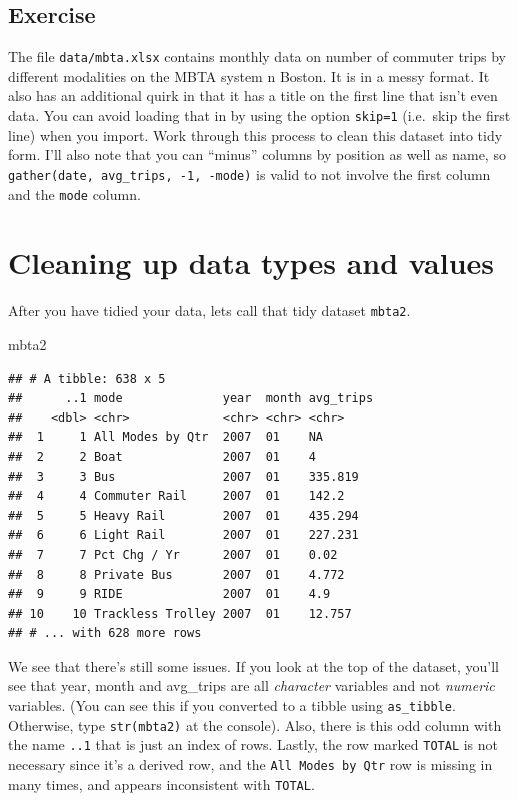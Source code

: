 \documentclass[12pt,letterpaperpaper,openany]{book}
\newenvironment{Shaded}{\begin{snugshade}}{\end{snugshade}}
\newcommand{\NormalTok}[1]{#1}
\begin{document}
\hypertarget{exercise}{%
\subsection*{Exercise}\label{exercise}}

The file \texttt{data/mbta.xlsx} contains monthly data on number of commuter trips by different modalities on the MBTA system n Boston. It
is in a messy format. It also has an additional quirk in that it has a title on the first line that
isn't even data. You can avoid loading that in by using the option \texttt{skip=1} (i.e.~skip the first line) when you
import. Work through this process to clean this dataset into tidy form. I'll also note that you can ``minus'' columns by
position as well as name, so \texttt{gather(date,\ avg\_trips,\ -1,\ -mode)} is valid to not involve the first column and the \texttt{mode} column.

\hypertarget{cleaning-up-data-types-and-values}{%
\section{Cleaning up data types and values}\label{cleaning-up-data-types-and-values}}

After you have tidied your data, lets call that tidy dataset \texttt{mbta2}.

\begin{Shaded}
\begin{Highlighting}[]
\NormalTok{mbta2}
\end{Highlighting}
\end{Shaded}

\begin{verbatim}
## # A tibble: 638 x 5
##      ..1 mode              year  month avg_trips
##    <dbl> <chr>             <chr> <chr> <chr>    
##  1     1 All Modes by Qtr  2007  01    NA       
##  2     2 Boat              2007  01    4        
##  3     3 Bus               2007  01    335.819  
##  4     4 Commuter Rail     2007  01    142.2    
##  5     5 Heavy Rail        2007  01    435.294  
##  6     6 Light Rail        2007  01    227.231  
##  7     7 Pct Chg / Yr      2007  01    0.02     
##  8     8 Private Bus       2007  01    4.772    
##  9     9 RIDE              2007  01    4.9      
## 10    10 Trackless Trolley 2007  01    12.757   
## # ... with 628 more rows
\end{verbatim}

We see that there's still some issues. If you look at the top of the dataset, you'll see
that year, month and avg\_trips are all \emph{character} variables and not \emph{numeric} variables. (You can see
this if you converted to a tibble using \texttt{as\_tibble}. Otherwise, type \texttt{str(mbta2)} at the console). Also, there
is this odd column with the name \texttt{..1} that is just an index of rows. Lastly, the row marked \texttt{TOTAL} is
not necessary since it's a derived row, and the \texttt{All\ Modes\ by\ Qtr} row is missing in many times, and appears inconsistent
with \texttt{TOTAL}.
\end{document}
